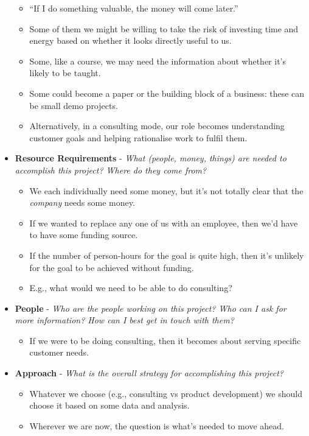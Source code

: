 \documentclass[11pt]{article}
\begin{document}
\begin{itemize}
\begin{itemize}
\item “If I do something valuable, the money will come later.”
\item Some of them we might be willing to take the risk of investing time and energy based on whether it looks directly useful to us.
\item Some, like a course, we may need the information about whether it’s likely to be taught.
\item Some could become a paper or the building block of a business: these can be small demo projects.
\item Alternatively, in a consulting mode, our role becomes understanding customer goals and helping rationalise work to fulfil them.
\end{itemize}
\item \textbf{Resource Requirements} - \emph{What (people, money, things) are needed to accomplish this project?  Where do they come from?}
\begin{itemize}
\item We each individually need some money, but it’s not totally clear that the \emph{company} needs some money.
\item If we wanted to replace any one of us with an employee, then we’d have to have some funding source.
\item If the number of person-hours for the goal is quite high, then it’s unlikely for the goal to be achieved without funding.
\item E.g., what would we need to be able to do consulting?
\end{itemize}
\item \textbf{People} - \emph{Who are the people working on this project? Who can I ask for more information? How can I best get in touch with them?}
\begin{itemize}
\item If we were to be doing consulting, then it becomes about serving specific customer needs.
\end{itemize}
\item \textbf{Approach} - \emph{What is the overall strategy for accomplishing this project?}
\begin{itemize}
\item Whatever we choose (e.g., consulting vs product development) we should choose it based on some data and analysis.
\item Wherever we are now, the question is what’s needed to move ahead.
\end{itemize}


\end{itemize}
\end{document}
